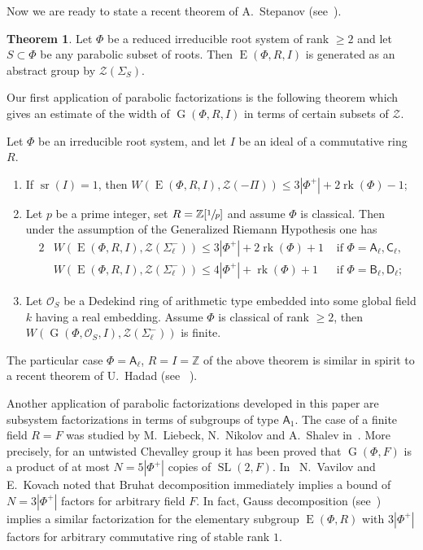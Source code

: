 \documentclass[12pt]{amsart}
\numberwithin{equation}{section}
\theoremstyle{definition}
\newtheorem*{thm*}{Theorem}
\DeclareMathOperator{\G}{G}
\DeclareMathOperator{\SL}{SL}
\DeclareMathOperator{\E}{E}
\DeclareMathOperator{\sr}{sr}
\DeclareMathOperator{\rk}{rk}
\newcommand{\rA}{\mathsf{A}}
\newcommand{\rB}{\mathsf{B}}
\newcommand{\rC}{\mathsf{C}}
\newcommand{\rD}{\mathsf{D}}
\begin{document}
Now we are ready to state a recent theorem of A.~Stepanov (see~\cite[Theorem~3.4]{S}).  
\begin{thm*}\label{thm:Stepanov}
Let $\Phi$ be a reduced irreducible root system of rank $\geq 2$ and let $S \subset \Phi$ be any parabolic subset of roots.
Then $\E(\Phi, R, I)$ is generated as an abstract group by $\mathcal{Z}(\Sigma_S)$.
\end{thm*}

Our first application of parabolic factorizations is the following theorem which gives an estimate of the width of $\G(\Phi, R, I)$ in terms of certain subsets of $\mathcal{Z}$.
\begin{thm}\label{thm:width} Let $\Phi$ be an irreducible root system, and let $I$ be an ideal of a commutative ring $R$.
\begin{enumerate}
\item If $\sr(I) = 1$, then $W(\E(\Phi,R,I),\mathcal{Z}(-\Pi))\leqslant 3|\Phi^+|+2\rk(\Phi)-1$;
\item Let $p$ be a prime integer, set $R = \mathbb{Z}[\sfrac{1}{p}]$ and assume $\Phi$ is classical. Then under the assumption of the Generalized Riemann Hypothesis one has
\begin{alignat*}{2}
& W(\E(\Phi,R,I), \mathcal{Z}(\Sigma_\ell^-))\leqslant 3|\Phi^+| + 2\rk(\Phi) + 1 & \text{ if } \Phi=\rA_\ell,\rC_\ell, \\
& W(\E(\Phi,R,I), \mathcal{Z}(\Sigma_\ell^-))\leqslant 4|\Phi^+| + \rk(\Phi) + 1 & \text{ if } \Phi=\rB_\ell,\rD_\ell;
\end{alignat*}
\item Let $\mathcal{O}_S$ be a Dedekind ring of arithmetic type embedded into some global field $k$ having a real embedding. 
Assume $\Phi$ is classical of rank $\geqslant2$, then $W(\G(\Phi,\mathcal{O}_S,I), \mathcal{Z}(\Sigma_\ell^-))$ is finite.
\end{enumerate}
\end{thm}
The particular case $\Phi = \rA_\ell$, $R = I = \mathbb{Z}$ of the above theorem is similar in spirit to a recent theorem of U.~Hadad (see ~\cite[Theorem~1.6]{Ha12}).

Another application of parabolic factorizations developed in this paper are subsystem factorizations in terms of subgroups of type $\rA_1$.
The case of a finite field $R=F$ was studied by M.~Liebeck, N.~Nikolov and A.~Shalev in~\cite{LiebNikShaSL2}.
More precisely, for an untwisted Chevalley group it has been proved that $\G(\Phi, F)$ is a product of at most $N=5|\Phi^+|$ copies of $\SL(2, F)$.
In~\cite{VavKovSL2} N.~Vavilov and E.~Kovach noted that Bruhat decomposition immediately implies a bound of $N=3|\Phi^+|$ factors for arbitrary field $F$.
In fact, Gauss decomposition (see~\cite{Sm12}) implies a similar factorization for the elementary subgroup $\E(\Phi, R)$ 
with $3|\Phi^+|$ factors for arbitrary commutative ring of stable rank $1$.
\end{document}
